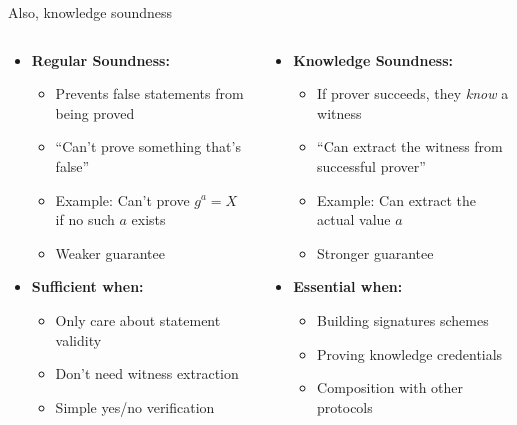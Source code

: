 \documentclass[aspectratio=169, lualatex, handout]{beamer}
\begin{document}
\begin{frame}{Also, knowledge soundness}
	\begin{columns}[c]
		\begin{column}{0.5\textwidth}
			\begin{itemize}
				\item \textbf{Regular Soundness:}
				      \begin{itemize}
					      \item Prevents false statements from being proved
					      \item ``Can't prove something that's false''
					      \item Example: Can't prove $g^a = X$ if no such $a$ exists
					      \item Weaker guarantee
				      \end{itemize}
				\item \textbf{Sufficient when:}
				      \begin{itemize}
					      \item Only care about statement validity
					      \item Don't need witness extraction
					      \item Simple yes/no verification
				      \end{itemize}
			\end{itemize}
		\end{column}
		\begin{column}{0.5\textwidth}
			\begin{itemize}
				\item \textbf{Knowledge Soundness:}
				      \begin{itemize}
					      \item If prover succeeds, they \textit{know} a witness
					      \item ``Can extract the witness from successful prover''
					      \item Example: Can extract the actual value $a$
					      \item Stronger guarantee
				      \end{itemize}
				\item \textbf{Essential when:}
				      \begin{itemize}
					      \item Building signatures schemes
					      \item Proving knowledge credentials
					      \item Composition with other protocols
				      \end{itemize}
			\end{itemize}
		\end{column}
	\end{columns}
\end{frame}
\end{document}
